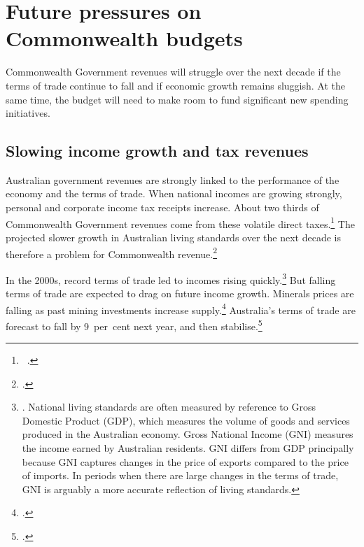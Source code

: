\documentclass[twoside,english]{Dianab5ona4portrait}
\begin{document}
\chapter{Future pressures on Commonwealth budgets}\label{chapter:FISCAL-3}
Commonwealth Government revenues will struggle over the next decade if the terms of trade continue to fall and if economic growth remains sluggish. At the same time, the budget will need to make room to fund significant new spending initiatives. 

\section{Slowing income growth and tax revenues}\label{sec:FISCAL-3-1}
Australian government revenues are strongly linked to the performance of the economy and the terms of trade. When national incomes are growing strongly, personal and corporate income tax receipts increase. About two thirds of Commonwealth Government revenues come from these volatile direct taxes.\footnote{\gao\ \textcite[][BP~No.~1, p.~5-18]{Treasury2014-Budget-Papers-2014-15}.}  The projected slower growth in Australian living standards over the next decade is therefore a problem for Commonwealth revenue.\footcite[][vii]{HenryTaxReview2010}

In the 2000s, record terms of trade led to incomes rising quickly.\footnote{\textcite{Carmody2013}. National living standards are often measured by reference to Gross Domestic Product (GDP), which measures the volume of goods and services produced in the Australian economy. Gross National Income (GNI) measures the income earned by Australian residents. GNI differs from GDP principally because GNI captures changes in the price of exports compared to the price of imports. In periods when there are large changes in the terms of trade, GNI is arguably a more accurate reflection of living standards.}  But falling terms of trade are expected to drag on future income growth. Minerals prices are falling as past mining investments increase supply.\footcites{Stevens2013}{MinifieCherastidthamMullerworthEtAl2013}  Australia’s terms of trade are forecast to fall by 9~per~cent next year, and then stabilise.\footcite[][2--5]{Treasury2015BudgetPapers201516}   
\end{document}
